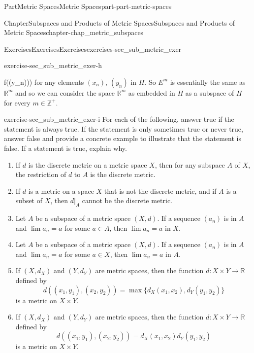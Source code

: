 \documentclass[oneside,10pt,]{book}
\numberwithin{equation}{chapter}
\newcommand{\Z}{\mathbb{Z}}
\newcommand{\R}{\mathbb{R}}
\begin{document}
\begin{partptx}{Part}{Metric Spaces}{}{Metric Spaces}{}{}{part-part-metric-spaces}
\begin{chapterptx}{Chapter}{Subspaces and Products of Metric Spaces}{}{Subspaces and Products of Metric Spaces}{}{}{chapter-chap_metric_subspaces}
\begin{exercises-section}{Exercises}{Exercises}{}{Exercises}{}{}{exercises-sec_sub_metric_exer}
\begin{divisionexercise}{8}{}{}{exercise-sec_sub_metric_exer-h}
\begin{enumerate}[font=\bfseries,label=(\alph*),ref=\alph*]
f((y_n)))\) for any elements \((x_n)\), \((y_n)\) in \(H\). So \(E^m\) is essentially the same as \(\R^m\) and so we can consider the space \(\R^m\) as embedded in \(H\) as a subspace of \(H\) for every \(m \in \Z^+\).%
\end{enumerate}%
\end{divisionexercise}%
\begin{divisionexercise}{9}{}{}{exercise-sec_sub_metric_exer-i}%
For each of the following, answer true if the statement is always true. If the statement is only sometimes true or never true, answer false and provide a concrete example to illustrate that the statement is false. If a statement is true, explain why.%
\begin{enumerate}[font=\bfseries,label=(\alph*),ref=\alph*]%
\item{}If \(d\) is the discrete metric on a metric space \(X\), then for any subspace \(A\) of \(X\), the restriction of \(d\) to \(A\) is the discrete metric.%
\item{}If \(d\) is a metric on a space \(X\) that is not the discrete metric, and if \(A\) is a subset of \(X\), then \(d|_A\) cannot be the discrete metric.%
\item{}Let \(A\) be a subspace of a metric space \((X,d)\). If a sequence \((a_n)\) is in \(A\) and \(\lim a_n = a\) for some \(a \in A\), then \(\lim a_n = a\) in \(X\).%
\item{}Let \(A\) be a subspace of a metric space \((X,d)\). If a sequence \((a_n)\) is in \(A\) and \(\lim a_n = a\) for some \(a \in X\), then \(\lim a_n = a\) in \(A\).%
\item{}If \((X,d_X)\) and \((Y, d_Y)\) are metric spaces, then the function \(d: X \times Y \to \R\) defined by%
\begin{equation*}
d((x_1,y_1), (x_2,y_2)) = \max\{d_X(x_1,x_2), d_Y(y_1,y_2)\}
\end{equation*}
is a metric on \(X \times Y\).%
\item{}If \((X,d_X)\) and \((Y, d_Y)\) are metric spaces, then the function \(d: X \times Y \to \R\) defined by%
\begin{equation*}
d((x_1,y_1), (x_2,y_2)) = d_X(x_1,x_2)d_Y(y_1,y_2)
\end{equation*}
is a metric on \(X \times Y\).%
\end{enumerate}%
\end{divisionexercise}%
\end{exercises-section}
\end{chapterptx}
\end{partptx}
\end{document}
